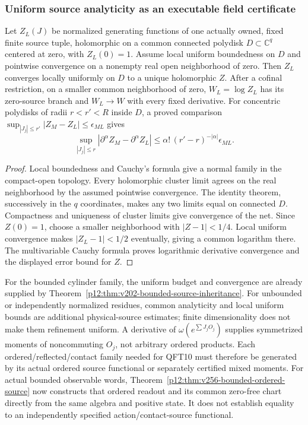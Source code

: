 \documentclass[12pt,a4paper]{article}
\begin{document}
\subsubsection{Uniform source analyticity as an executable field certificate}
\begin{theorem}
\label{p12:thm:v2210-lit-source-analyticity}
Let $Z_L(J)$ be normalized generating functions of one actually owned,
fixed finite source tuple, holomorphic on a common connected polydisk
$D\subset\mathbb C^q$ centered at zero, with $Z_L(0)=1$.
Assume local uniform boundedness on $D$ and pointwise convergence on a
nonempty real open neighborhood of zero. Then $Z_L$ converges locally
uniformly on $D$ to a unique holomorphic $Z$. After a cofinal restriction, on a smaller common
neighborhood of zero, $W_L=\log Z_L$ has its zero-source branch and
$W_L\to W$ with every fixed derivative.
For concentric polydisks of radii $r<r'<R$ inside $D$, a proved comparison
$\sup_{|J_j|\le r'}|Z_M-Z_L|\le\epsilon_{ML}$ gives
\[
 \sup_{|J_j|\le r}|\partial^\alpha Z_M-\partial^\alpha Z_L|
 \le\alpha!\,(r'-r)^{-|\alpha|}\epsilon_{ML}.
\]
\end{theorem}
\begin{proof}
Local boundedness and Cauchy's formula give a normal family in the compact-open
topology. Every holomorphic cluster limit agrees on the real neighborhood
by the assumed pointwise convergence. The identity theorem, successively
in the $q$ coordinates, makes any two limits equal on connected $D$.
Compactness and uniqueness of cluster limits give convergence of the net.
Since $Z(0)=1$, choose a smaller neighborhood with $|Z-1|<1/4$.
Local uniform convergence makes $|Z_L-1|<1/2$ eventually, giving a common
logarithm there. The multivariable Cauchy formula proves logarithmic
derivative convergence and the displayed error bound for $Z$.
\end{proof}
For the bounded cylinder family, the uniform budget and convergence are
already supplied by Theorem~\ref{p12:thm:v202-bounded-source-inheritance}.
For unbounded or independently normalized residues, common analyticity and
local uniform bounds are additional physical-source estimates; finite
dimensionality does not make them refinement uniform. A derivative of
$\omega(e^{\sum J_jO_j})$ supplies symmetrized moments of noncommuting
$O_j$, not arbitrary ordered products. Each ordered/reflected/contact
family needed for QFT10 must therefore be generated by its actual
ordered source functional or separately certified mixed moments.
For actual bounded observable words,
Theorem~\ref{p12:thm:v256-bounded-ordered-source} now constructs
that ordered readout and its common zero-free chart directly from
the same algebra and positive state.  It does not establish equality
to an independently specified action/contact-source functional.
\end{document}
